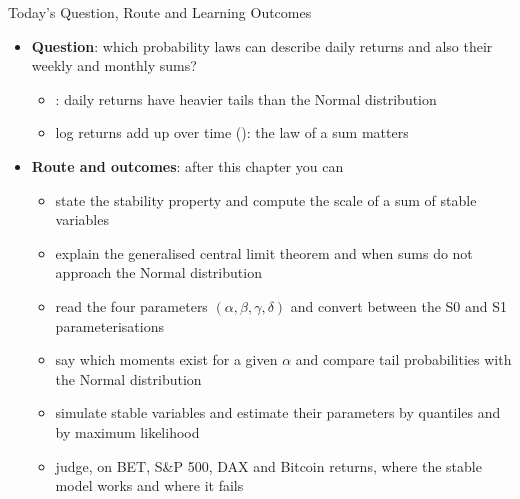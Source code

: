 \begin{frame}{Today's Question, Route and Learning Outcomes}
\itemsize{\small}
\begin{itemize}
    \item \textbf{Question}: which probability laws can describe daily returns and also their weekly and monthly sums?
    \begin{itemize}
        \item {}: daily returns have heavier tails than the Normal distribution
        \item log returns add up over time (): the law of a sum matters
    \end{itemize}
    \item \textbf{Route and outcomes}: after this chapter you can
    \begin{itemize}
        \item state the stability property and compute the scale of a sum of stable variables
        \item explain the generalised central limit theorem and when sums do not approach the Normal distribution
        \item read the four parameters $(\alpha, \beta, \gamma, \delta)$ and convert between the S0 and S1 parameterisations
        \item say which moments exist for a given $\alpha$ and compare tail probabilities with the Normal distribution
        \item simulate stable variables and estimate their parameters by quantiles and by maximum likelihood
        \item judge, on BET, S\&P 500, DAX and Bitcoin returns, where the stable model works and where it fails
    \end{itemize}
\end{itemize}
\end{frame}

